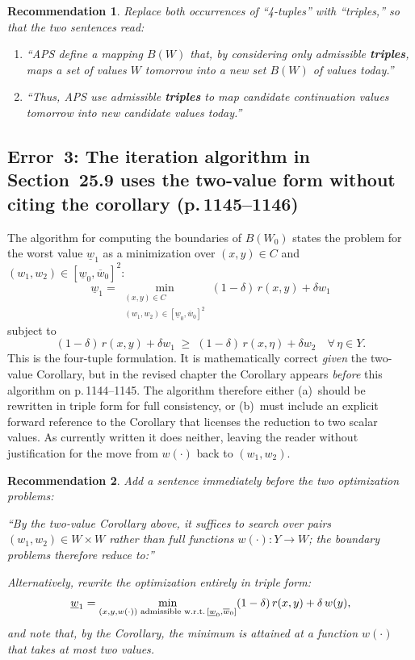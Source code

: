 \documentclass[12pt]{article}
\newtheorem{recommendation}{Recommendation}
\begin{document}
\begin{recommendation}
Replace both occurrences of ``4-tuples'' with ``triples,'' so that the
two sentences read:

\begin{enumerate}
\item ``APS define a mapping $B(W)$ that, by considering only admissible
      \textbf{triples}, maps a set of values $W$ tomorrow into a new set
      $B(W)$ of values today.''
\item ``Thus, APS use admissible \textbf{triples} to map candidate
      continuation values tomorrow into new candidate values today.''
\end{enumerate}
\end{recommendation}

\subsection{Error~3: The iteration algorithm in Section~25.9 uses the
two-value form without citing the corollary (p.\,1145--1146)}

The algorithm for computing the boundaries of $B(W_0)$ states the
problem for the worst value $\underline{w}_1$ as a minimization over
$(x,y)\in C$ and $(w_1,w_2)\in[\underline{w}_0,\overline{w}_0]^2$:
\[
\underline{w}_1 =
\min_{\substack{(x,y)\in C\\(w_1,w_2)\in[\underline{w}_0,\overline{w}_0]^2}}
(1-\delta)\,r(x,y)+\delta w_1
\]
subject to
\[
(1-\delta)\,r(x,y)+\delta w_1 \;\ge\;
(1-\delta)\,r(x,\eta)+\delta w_2
\quad\forall\,\eta\in Y.
\]
This is the four-tuple formulation.  It is mathematically correct
\emph{given} the two-value Corollary, but in the revised chapter the
Corollary appears \emph{before} this algorithm on p.\,1144--1145.
The algorithm therefore either (a)~should be rewritten in triple form
for full consistency, or (b)~must include an explicit forward reference to
the Corollary that licenses the reduction to two scalar values.  As
currently written it does neither, leaving the reader without justification
for the move from $w(\cdot)$ back to $(w_1,w_2)$.

\begin{recommendation}
Add a sentence immediately before the two optimization problems:

\smallskip
\noindent
``By the two-value Corollary above, it suffices to search over pairs
$(w_1,w_2)\in W\times W$ rather than full functions $w(\cdot):Y\to W$;
the boundary problems therefore reduce to:''

\smallskip
\noindent
Alternatively, rewrite the optimization entirely in triple form:
\[
\underline{w}_1 =
\min_{(x,y,w(\cdot))\text{ admissible w.r.t.\,}[\underline{w}_0,\overline{w}_0]}
(1-\delta)\,r(x,y)+\delta\,w(y),
\]
and note that, by the Corollary, the minimum is attained at a function
$w(\cdot)$ that takes at most two values.
\end{recommendation}
\end{document}
